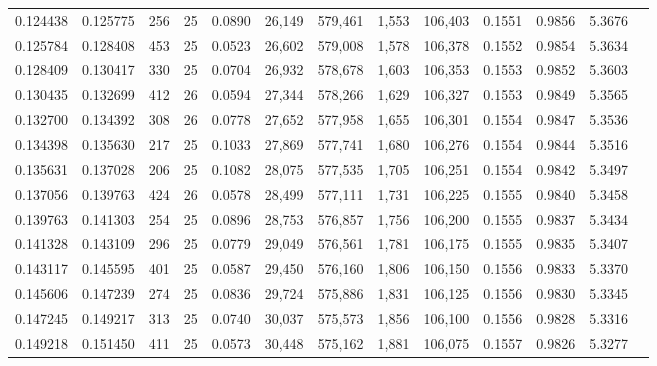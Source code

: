 \begin{tabular}{rrrrrrrrrrrrr}
0.124438 & 0.125775 &   256 &  25 &                                     0.0890 &  26,149 & 579,461 &   1,553 & 106,403 & 0.1551 & 0.9856 & 5.3676 \\
0.125784 & 0.128408 &   453 &  25 &                                     0.0523 &  26,602 & 579,008 &   1,578 & 106,378 & 0.1552 & 0.9854 & 5.3634 \\
0.128409 & 0.130417 &   330 &  25 &                                     0.0704 &  26,932 & 578,678 &   1,603 & 106,353 & 0.1553 & 0.9852 & 5.3603 \\
0.130435 & 0.132699 &   412 &  26 &                                     0.0594 &  27,344 & 578,266 &   1,629 & 106,327 & 0.1553 & 0.9849 & 5.3565 \\
0.132700 & 0.134392 &   308 &  26 &                                     0.0778 &  27,652 & 577,958 &   1,655 & 106,301 & 0.1554 & 0.9847 & 5.3536 \\
0.134398 & 0.135630 &   217 &  25 &                                     0.1033 &  27,869 & 577,741 &   1,680 & 106,276 & 0.1554 & 0.9844 & 5.3516 \\
0.135631 & 0.137028 &   206 &  25 &                                     0.1082 &  28,075 & 577,535 &   1,705 & 106,251 & 0.1554 & 0.9842 & 5.3497 \\
0.137056 & 0.139763 &   424 &  26 &                                     0.0578 &  28,499 & 577,111 &   1,731 & 106,225 & 0.1555 & 0.9840 & 5.3458 \\
0.139763 & 0.141303 &   254 &  25 &                                     0.0896 &  28,753 & 576,857 &   1,756 & 106,200 & 0.1555 & 0.9837 & 5.3434 \\
0.141328 & 0.143109 &   296 &  25 &                                     0.0779 &  29,049 & 576,561 &   1,781 & 106,175 & 0.1555 & 0.9835 & 5.3407 \\
0.143117 & 0.145595 &   401 &  25 &                                     0.0587 &  29,450 & 576,160 &   1,806 & 106,150 & 0.1556 & 0.9833 & 5.3370 \\
0.145606 & 0.147239 &   274 &  25 &                                     0.0836 &  29,724 & 575,886 &   1,831 & 106,125 & 0.1556 & 0.9830 & 5.3345 \\
0.147245 & 0.149217 &   313 &  25 &                                     0.0740 &  30,037 & 575,573 &   1,856 & 106,100 & 0.1556 & 0.9828 & 5.3316 \\
0.149218 & 0.151450 &   411 &  25 &                                     0.0573 &  30,448 & 575,162 &   1,881 & 106,075 & 0.1557 & 0.9826 & 5.3277 \\

\end{tabular}
